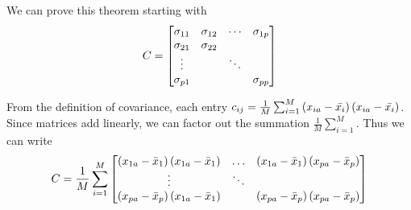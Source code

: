 \documentclass[12pt]{report}
\begin{document}
            \begin{myproof}
                We can prove this theorem starting with
                    \[
                        C = \begin{bmatrix}
                            \sigma_{11} & \sigma_{12} & \cdots & \sigma_{1p} \\
                            \sigma_{21} & \sigma_{22} &        &             \\
                            \vdots      &             & \ddots &             \\
                            \sigma_{p1} &             &        & \sigma_{pp}
                        \end{bmatrix}
                    \]
        
                From the definition of covariance, each entry $c_{ij} = \frac{1}{M} \sum _{i=1}^M \left( x_{ia} - \bar{x_i}\right) \left(x_{ia} - \bar{x_i}\right)$. Since matrices add linearly, we can factor out the summation $\frac{1}{M} \sum_{i=1}^M$. Thus we can write
                    \[
                        C = \frac{1}{M} \sum_{i=1}^M \begin{bmatrix}
                            \left(x_{1a} - \bar{x}_1\right) \left(x_{1a} - \bar{x}_1\right) & \dotsc  & \left(x_{1a} - \bar{x}_1\right) \left(x_{pa} - \bar{x}_p\right) \\
                            \vdots & \ddots & \\
                            \left(x_{pa} - \bar{x}_p\right) \left(x_{1a} - \bar{x}_1\right) &  & \left(x_{pa} - \bar{x}_p\right) \left(x_{pa} - \bar{x}_p\right)
                        \end{bmatrix}
                    \] 
                

\end{myproof}
\end{document}
